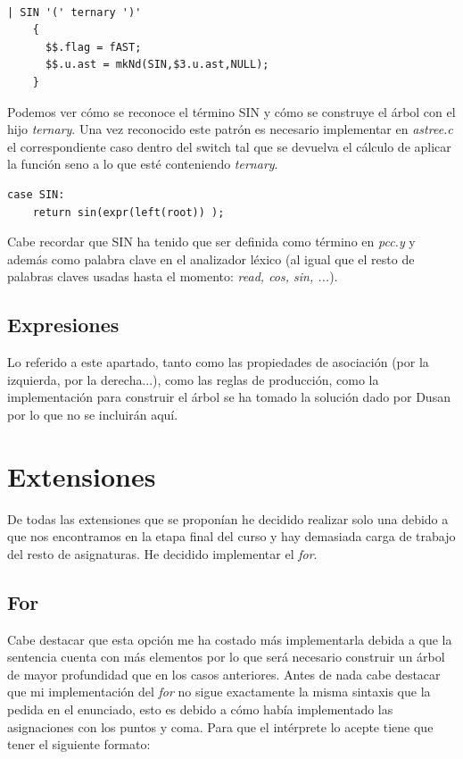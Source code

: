 \documentclass[11pt]{article}
\begin{document}
\begin{verbatim}

| SIN '(' ternary ')'
    {
      $$.flag = fAST;
      $$.u.ast = mkNd(SIN,$3.u.ast,NULL);
    }

\end{verbatim}

\noindent Podemos ver cómo se reconoce el término SIN y cómo se construye el árbol con el hijo \textit{ternary}. Una vez reconocido este patrón es necesario implementar en \textit{astree.c} el correspondiente caso dentro del switch tal que se devuelva el cálculo de aplicar la función seno a lo que esté conteniendo \textit{ternary}.

\begin{verbatim}
case SIN:
    return sin(expr(left(root)) );
\end{verbatim}

\noindent Cabe recordar que SIN ha tenido que ser definida como término en \textit{pcc.y} y además como palabra clave en el analizador léxico (al igual que el resto de palabras claves usadas hasta el momento: \textit{read, cos, sin, ...}).

\subsection{Expresiones}

\noindent Lo referido a este apartado, tanto como las propiedades de asociación (por la izquierda, por la derecha...), como las reglas de producción, como la implementación para construir el árbol se ha tomado la solución dado por Dusan por lo que no se incluirán aquí.

\newpage

\section{Extensiones}

\noindent De todas las extensiones que se proponían he decidido realizar solo una debido a que nos encontramos en la etapa final del curso y hay demasiada carga de trabajo del resto de asignaturas. He decidido implementar el \textit{for}.

\subsection{For}

\noindent Cabe destacar que esta opción me ha costado más implementarla debida a que la sentencia cuenta con más elementos por lo que será necesario construir un árbol de mayor profundidad que en los casos anteriores. Antes de nada cabe destacar que mi implementación del \textit{for} no sigue exactamente la misma sintaxis que la pedida en el enunciado, esto es debido a cómo había implementado las asignaciones con los puntos y coma. Para que el intérprete lo acepte tiene que tener el siguiente formato:
\end{document}
